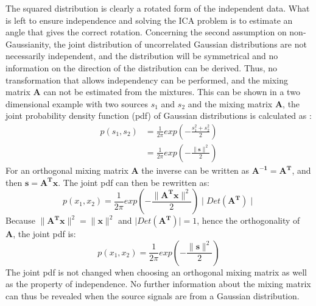 The squared distribution is clearly a rotated form of the independent data. What is left to ensure independence and solving the ICA problem is to estimate an angle that gives the correct rotation.
Concerning the second assumption on non-Gaussianity, the joint distribution of uncorrelated Gaussian distributions are not necessarily independent, and the distribution will be symmetrical and no information on the direction of the distribution can be derived. Thus, no transformation that allows independency can be performed, and the mixing matrix \textbf{A} can not be estimated from the mixtures. This can be shown in a two dimensional example with two sources $s_1$ and $s_2$ and the mixing matrix \textbf{A}, the joint probability density function (pdf) of Gaussian distributions is calculated as \cite{Hyvarinen2001}:
\begin{equation} \label{using this?}
\begin{split}
p(s_1,s_2) & = \frac{1}{2\pi}exp(-\frac{s^{2}_{1}+s^{2}_{2}}{2}) \\
& = \frac{1}{2\pi}exp(-\frac{\parallel \mathbf{s} \parallel ^2}{2}) 
\end{split}
\end{equation}
For an orthogonal mixing matrix \textbf{A} the inverse can be written as $\mathbf{A^{-1}} = \mathbf{{A^T}}$, and then $\mathbf{{s} = \mathbf{A^T} \mathbf{x}}$. The joint pdf can then be rewritten as:
\begin{equation}
p(x_1,x_2) = \frac{1}{2\pi}exp(-\frac{\parallel \mathbf{A^T} \mathbf{x} \parallel ^2}{2}) \mid Det (\mathbf{A^T}) \mid
\end{equation}
Because ${\parallel \mathbf{A^T} \mathbf{x} \parallel ^2} = \parallel \mathbf{x} \parallel ^2$ and $\mid Det ( \mathbf{A^T} ) \mid = 1$, hence the orthogonality of \textbf{A}, the joint pdf is:
\begin{equation}
p(x_1,x_2) = \frac{1}{2\pi}exp(-\frac{\parallel \mathbf{s} \parallel ^2}{2}) 
\end{equation}
The joint pdf is not changed when choosing an orthogonal mixing matrix as well as the property of independence. No further information about the mixing matrix can thus be revealed when the source signals are from a Gaussian distribution. \cite{Hyvarinen2001}

